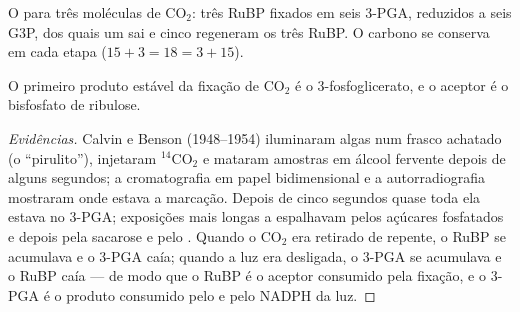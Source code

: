\begin{omfigure}

{\small O  para três moléculas de $\mathrm{CO_2}$: três
RuBP fixados em seis 3-PGA, reduzidos a seis G3P, dos quais um sai e
cinco regeneram os três RuBP. O carbono se conserva em cada etapa
($15 + 3 = 18 = 3 + 15$).}
\end{omfigure}

\begin{proposition}\label{prop:b1:photosynthesis:calvin}
O primeiro produto estável da fixação de $\mathrm{CO_2}$ é o
3-fosfoglicerato, e o aceptor é o bisfosfato de ribulose.
\end{proposition}
\begin{proof}[Evidências]
Calvin e Benson (1948--1954) iluminaram algas num frasco achatado (o
``pirulito''), injetaram $\mathrm{^{14}CO_2}$ e mataram amostras em
álcool fervente depois de alguns segundos; a cromatografia em papel
bidimensional e a autorradiografia mostraram onde estava a marcação.
Depois de cinco segundos quase toda ela estava no 3-PGA; exposições mais
longas a espalhavam pelos açúcares fosfatados e depois pela sacarose e
pelo . Quando o $\mathrm{CO_2}$ era retirado de repente, o RuBP se
acumulava e o 3-PGA caía; quando a luz era desligada, o 3-PGA se
acumulava e o RuBP caía --- de modo que o RuBP é o aceptor consumido
pela fixação, e o 3-PGA é o produto consumido pelo  e pelo NADPH da
luz.
\end{proof}

